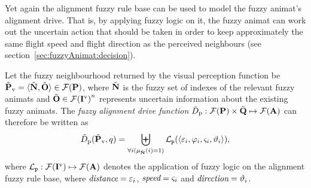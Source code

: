 Yet again the alignment fuzzy rule base can be used to model the fuzzy animat's alignment drive. That is, by applying fuzzy logic on it, the fuzzy animat can work out the uncertain action that should be taken in order to keep approximately the same flight speed and flight direction as the perceived neighbours (see section~\ref{sec:fuzzyAnimat:decision}).

\begin{defn}
\label{def:fuzzyAnimat:Dp:afd} 
Let the fuzzy neighbourhood returned by the visual perception function be ${\tilde{{\mathbf{P}}}}_\mathrm{v}=\langle {\ensuremath{\tilde{{\mathbf{N}}}}}, {\tilde{{\mathbf{O}}}} \rangle \in {\ensuremath{\mathcal{F}({\mathbf{P}})}}$, where ${\tilde{{\mathbf{N}}}}$ is the fuzzy set of indexes of the relevant fuzzy animats and ${\tilde{{\mathbf{O}}}} \in {\ensuremath{\mathcal{F}({\mathbf{I}}^\mathrm{v})}}^n$ represents uncertain information about the existing fuzzy animats. The \emph{fuzzy alignment drive function} ${\tilde{D}}_\mathrm{p}: {\mathcal{F}({\mathbf{P}})} \times {\ensuremath{\tilde{{\mathbf{Q}}}}} \mapsto {\ensuremath{\mathcal{F}({\mathbf{A}})}}$ can therefore be written as
\begin{equation}
\ffunc{D}_\mathrm{p}(\fset{P}_\mathrm{v},q)=%
 \biguplus_{\forall i(\mu_\fset{N}(i)=1)} \mathcal{L}_\texttt{p}(\langle \varepsilon_i, \varphi_i, \varsigma_i, \vartheta_i \rangle),
\end{equation}
where $\mathcal{L}_\texttt{p}: {\mathcal{F}({\mathbf{I}}^\mathrm{v})} \mapsto {\ensuremath{\mathcal{F}({\mathbf{A}})}}$ denotes the application of fuzzy logic on the alignment fuzzy rule base, where $\emph{distance}=\varepsilon_i$, $\emph{speed}=\varsigma_i$ and $\emph{direction}=\vartheta_i$.
\end{defn}

